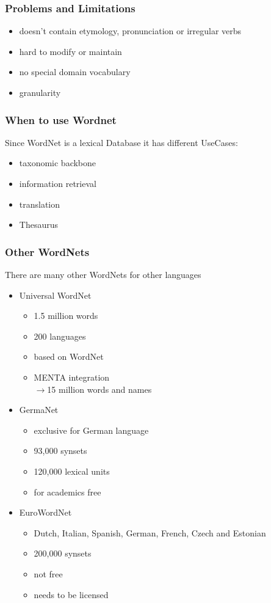 \begin{frame}
\frametitle{Problems and Limitations}
\begin{itemize}
\item doesn't contain etymology, pronunciation or irregular verbs
\item hard to modify or maintain
\item no special domain vocabulary
\item granularity
\end{itemize}
\end{frame}


\begin{frame}
\frametitle{When to use Wordnet}
Since WordNet is a lexical Database it has different UseCases:
\begin{itemize}
\item taxonomic backbone
\item information retrieval
\item translation
\item Thesaurus
\end{itemize}
\end{frame}

\begin{frame}
\frametitle{Other WordNets}
There are many other WordNets for other languages
\begin{itemize}
\item Universal WordNet
\begin{itemize}
\item 1.5 million words
\item 200 languages
\item based on WordNet
\item MENTA integration\\
$\rightarrow$15 million words and names
\end{itemize}
\item GermaNet
\begin{itemize}
\item exclusive for German language
\item 93,000 synsets
\item 120,000 lexical units
\item for academics free
\end{itemize}
\item EuroWordNet
\begin{itemize}
\item Dutch, Italian, Spanish, German, French, Czech and Estonian
\item 200,000 synsets
\item not free
\item needs to be licensed
\end{itemize}
\end{itemize}
\end{frame}